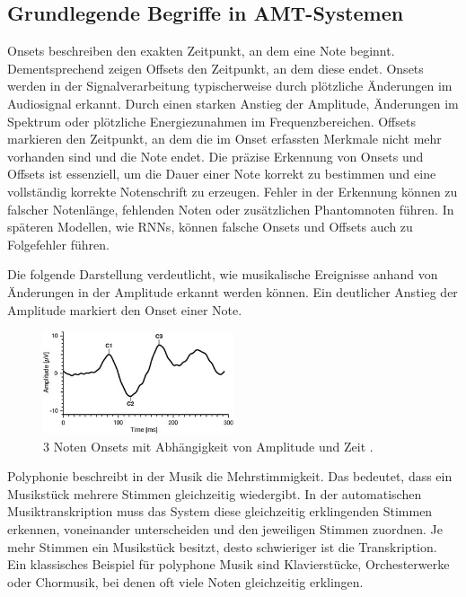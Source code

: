 \subsection{Grundlegende Begriffe in AMT-Systemen}
\begin{description}[style=nextline]
\item[Onsets und Offsets]\label{itm:onset_offset}
Onsets beschreiben den exakten Zeitpunkt, an dem eine Note beginnt.
Dementsprechend zeigen Offsets den Zeitpunkt, an dem diese endet.
Onsets werden in der Signalverarbeitung typischerweise durch plötzliche Änderungen im Audiosignal erkannt.
Durch einen starken Anstieg der Amplitude, Änderungen im Spektrum oder plötzliche Energiezunahmen im Frequenzbereichen.
Offsets markieren den Zeitpunkt, an dem die im Onset erfassten Merkmale nicht mehr vorhanden sind und die Note endet.
Die präzise Erkennung von Onsets und Offsets ist essenziell,
um die Dauer einer Note korrekt zu bestimmen und eine vollständig korrekte Notenschrift zu erzeugen.
Fehler in der Erkennung können zu falscher Notenlänge, fehlenden Noten oder zusätzlichen Phantomnoten führen.
In späteren Modellen, wie RNNs, können falsche Onsets und Offsets auch zu Folgefehler führen.

Die folgende Darstellung verdeutlicht,
wie musikalische Ereignisse anhand von Änderungen in der Amplitude erkannt werden können.
Ein deutlicher Anstieg der Amplitude markiert den Onset einer Note.
\begin{figure}[H]
    \centering
    \includegraphics[width=0.5\textwidth]{Graphics/Onset_detection}
    \caption[Noten Onsets]{3 Noten Onsets mit Abhängigkeit von Amplitude und Zeit \cite{brown2016patternvep}.}
    \label{fig:onsets}
\end{figure}
\end{description}

\begin{description}[style=nextline]
\item[Polyphonie]\label{itm:polyphonie}
Polyphonie beschreibt in der Musik die Mehrstimmigkeit.
Das bedeutet, dass ein Musikstück mehrere Stimmen gleichzeitig wiedergibt.
In der automatischen Musiktranskription muss das System diese gleichzeitig erklingenden Stimmen erkennen, voneinander unterscheiden und den jeweiligen Stimmen zuordnen.
Je mehr Stimmen ein Musikstück besitzt, desto schwieriger ist die Transkription.
Ein klassisches Beispiel für polyphone Musik sind Klavierstücke, Orchesterwerke oder Chormusik, bei denen oft viele Noten gleichzeitig erklingen.
\end{description}

